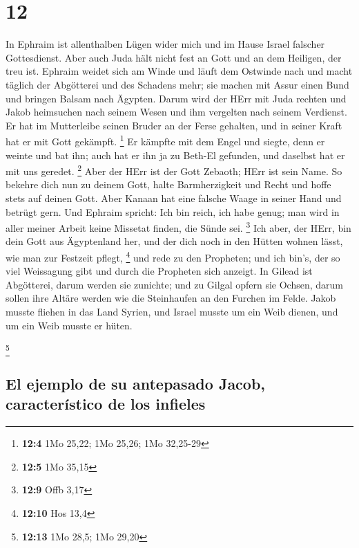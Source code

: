 \hypertarget{section-11}{%
\section{12}\label{section-11}}

 In Ephraim ist allenthalben Lügen wider mich und im Hause
Israel falscher Gottesdienst. Aber auch Juda hält nicht fest an Gott und
an dem Heiligen, der treu ist.  Ephraim weidet sich am
Winde und läuft dem Ostwinde nach und macht täglich der Abgötterei und
des Schadens mehr; sie machen mit Assur einen Bund und bringen Balsam
nach Ägypten.  Darum wird der HErr mit Juda rechten und
Jakob heimsuchen nach seinem Wesen und ihm vergelten nach seinem
Verdienst.  Er hat im Mutterleibe seinen Bruder an der
Ferse gehalten, und in seiner Kraft hat er mit Gott gekämpft.
\footnote{\textbf{12:4} 1Mo 25,22; 1Mo 25,26; 1Mo 32,25-29}
 Er kämpfte mit dem Engel und siegte, denn er weinte und
bat ihn; auch hat er ihn ja zu Beth-El gefunden, und daselbst hat er mit
uns geredet. \footnote{\textbf{12:5} 1Mo 35,15}  Aber der
HErr ist der Gott Zebaoth; HErr ist sein Name.  So bekehre
dich nun zu deinem Gott, halte Barmherzigkeit und Recht und hoffe stets
auf deinen Gott.  Aber Kanaan hat eine falsche Waage in
seiner Hand und betrügt gern.  Und Ephraim spricht: Ich
bin reich, ich habe genug; man wird in aller meiner Arbeit keine
Missetat finden, die Sünde sei. \footnote{\textbf{12:9} Offb 3,17}
 Ich aber, der HErr, bin dein Gott aus Ägyptenland her,
und der dich noch in den Hütten wohnen lässt, wie man zur Festzeit
pflegt, \footnote{\textbf{12:10} Hos 13,4}  und rede zu
den Propheten; und ich bin's, der so viel Weissagung gibt und durch die
Propheten sich anzeigt.  In Gilead ist Abgötterei, darum
werden sie zunichte; und zu Gilgal opfern sie Ochsen, darum sollen ihre
Altäre werden wie die Steinhaufen an den Furchen im Felde.
 Jakob musste fliehen in das Land Syrien, und Israel
musste um ein Weib dienen, und um ein Weib musste er hüten.

\footnote{\textbf{12:13} 1Mo 28,5; 1Mo 29,20}

\hypertarget{el-ejemplo-de-su-antepasado-jacob-caracteruxedstico-de-los-infieles}{%
\subsection{El ejemplo de su antepasado Jacob, característico de los
infieles}\label{el-ejemplo-de-su-antepasado-jacob-caracteruxedstico-de-los-infieles}}

